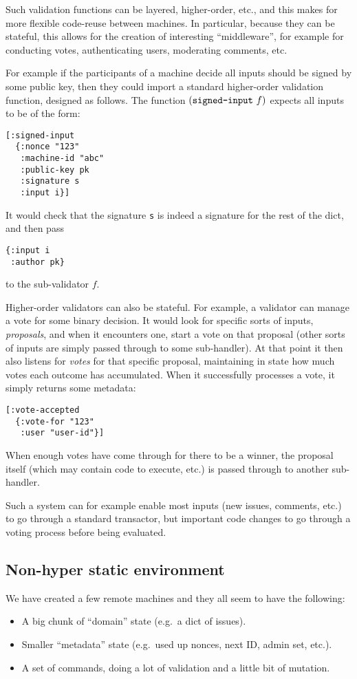 \documentclass[a4paper, oneside, 10pt]{amsart}
\begin{document}
Such validation functions can be layered, higher-order, etc., and this makes for
more flexible code-reuse between machines. In particular, because they can be
stateful, this allows for the creation of interesting ``middleware'', for
example for conducting votes, authenticating users, moderating comments, etc.

For example if the participants of a machine decide all inputs should be signed
by some public key, then they could import a standard higher-order validation
function, designed as follows. The function $(\text{\texttt{signed-input}} \ f)$
expects all inputs to be of the form:
\begin{lstlisting}
[:signed-input
  {:nonce "123"
   :machine-id "abc"
   :public-key pk
   :signature s
   :input i}]
\end{lstlisting}
It would check that the signature \texttt{s} is indeed a signature for
the rest of the dict, and then pass
\begin{lstlisting}
{:input i
 :author pk}
\end{lstlisting}
to the sub-validator $f$.

Higher-order validators can also be stateful. For example, a validator can
manage a vote for some binary decision. It would look for specific sorts of
inputs, \emph{proposals}, and when it encounters one, start a vote on that
proposal (other sorts of inputs are simply passed through to some
sub-handler). At that point it then also listens for \emph{votes} for that
specific proposal, maintaining in state how much votes each outcome has
accumulated. When it successfully processes a vote, it simply returns some
metadata:
\begin{lstlisting}
[:vote-accepted
  {:vote-for "123"
   :user "user-id"}]
\end{lstlisting}
When enough votes have come through for there to be a winner, the proposal
itself (which may contain code to execute, etc.) is passed through to another
sub-handler.

Such a system can for example enable most inputs (new issues, comments, etc.) to
go through a standard transactor, but important code changes to go through a
voting process before being evaluated.

\subsection{Non-hyper static environment}\label{nonhyper}

We have created a few remote machines and they all seem to have the
following:
\begin{itemize}
\item
  A big chunk of ``domain'' state (e.g.~a dict of issues).
\item
  Smaller ``metadata'' state (e.g.~used up nonces, next ID, admin set,
  etc.).
\item
  A set of commands, doing a lot of validation and a little bit of
  mutation.
\end{itemize}
\end{document}
